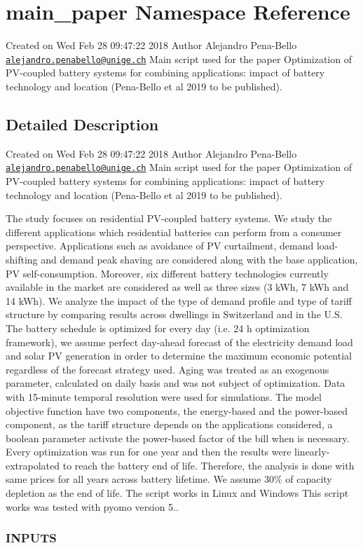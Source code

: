\hypertarget{namespacemain__paper}{}\section{main\+\_\+paper Namespace Reference}
\label{namespacemain__paper}


Created on Wed Feb 28 09\+:47\+:22 2018 Author Alejandro Pena-\/\+Bello \href{mailto:alejandro.penabello@unige.ch}{\tt alejandro.\+penabello@unige.\+ch} Main script used for the paper Optimization of P\+V-\/coupled battery systems for combining applications\+: impact of battery technology and location (Pena-\/\+Bello et al 2019 to be published).  




\subsection{Detailed Description}
Created on Wed Feb 28 09\+:47\+:22 2018 Author Alejandro Pena-\/\+Bello \href{mailto:alejandro.penabello@unige.ch}{\tt alejandro.\+penabello@unige.\+ch} Main script used for the paper Optimization of P\+V-\/coupled battery systems for combining applications\+: impact of battery technology and location (Pena-\/\+Bello et al 2019 to be published). 

The study focuses on residential P\+V-\/coupled battery systems. We study the different applications which residential batteries can perform from a consumer perspective. Applications such as avoidance of PV curtailment, demand load-\/shifting and demand peak shaving are considered along with the base application, PV self-\/consumption. Moreover, six different battery technologies currently available in the market are considered as well as three sizes (3 k\+Wh, 7 k\+Wh and 14 k\+Wh). We analyze the impact of the type of demand profile and type of tariff structure by comparing results across dwellings in Switzerland and in the U.\+S. The battery schedule is optimized for every day (i.\+e. 24 h optimization framework), we assume perfect day-\/ahead forecast of the electricity demand load and solar PV generation in order to determine the maximum economic potential regardless of the forecast strategy used. Aging was treated as an exogenous parameter, calculated on daily basis and was not subject of optimization. Data with 15-\/minute temporal resolution were used for simulations. The model objective function have two components, the energy-\/based and the power-\/based component, as the tariff structure depends on the applications considered, a boolean parameter activate the power-\/based factor of the bill when is necessary. Every optimization was run for one year and then the results were linearly-\/extrapolated to reach the battery end of life. Therefore, the analysis is done with same prices for all years across battery lifetime. We assume 30\% of capacity depletion as the end of life. The script works in Linux and Windows This script works was tested with pyomo version 5.. \subsubsection*{I\+N\+P\+U\+TS }

